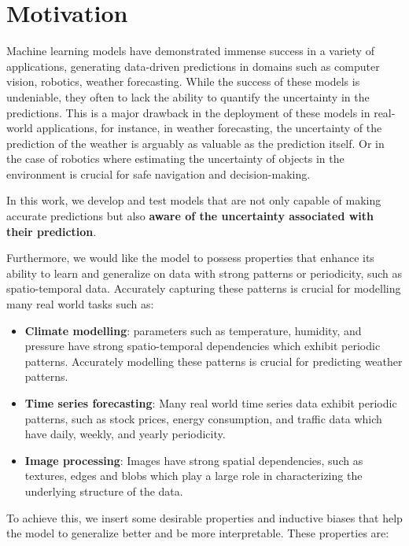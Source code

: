 \documentclass[../../main.tex]{subfiles}
\begin{document}
\section{Motivation}

Machine learning models have demonstrated immense success in a variety of applications, generating data-driven  predictions in domains such as computer vision, robotics, weather forecasting. While the success of these models is undeniable, they often to lack the ability to quantify the uncertainty in the predictions. This is a major drawback in the deployment of these models in real-world applications, for instance, in weather forecasting,  the uncertainty of the prediction of the weather is arguably as valuable as the prediction itself. Or in the case of robotics where estimating the uncertainty of objects in the environment is crucial for safe navigation and decision-making.

In this work, we develop and test models that are not only capable of making accurate predictions but also \textbf{aware of the uncertainty associated with their prediction}.

Furthermore, we would like the model to possess properties that enhance its ability to learn and generalize on data with strong patterns or periodicity, such as spatio-temporal data. Accurately capturing these patterns is crucial for modelling many real world tasks such as:

\begin{itemize}
	\item \textbf{Climate modelling}: parameters such as temperature, humidity, and pressure have strong spatio-temporal dependencies which exhibit periodic patterns. Accurately modelling these patterns is crucial for predicting weather patterns.
	\item \textbf{Time series forecasting}: Many real world time series data exhibit periodic patterns, such as stock prices, energy consumption, and traffic data which have daily, weekly, and yearly periodicity. 
	\item \textbf{Image processing}: Images have strong spatial dependencies, such as textures, edges and blobs which play a large role in characterizing the underlying structure of the data.
\end{itemize}


To achieve this, we insert some desirable properties and inductive biases that help the model to generalize better and be more interpretable. These properties are:
\end{document}
